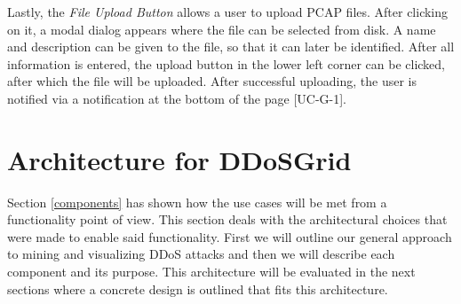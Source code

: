 Lastly, the \emph{File Upload Button} allows a user to upload PCAP files. After clicking on it, a modal dialog appears where the file can be selected from disk. A name and description can be given to the file, so that it can later be identified. After all information is entered, the upload button in the lower left corner can be clicked, after which the file will be uploaded. After successful uploading, the user is notified via a notification at the bottom of the page [UC-G-1].

\section{Architecture for DDoSGrid}
Section \ref{components} has shown how the use cases will be met from a functionality point of view. This section deals with the architectural choices that were made to enable said functionality. First we will outline our general approach to mining and visualizing DDoS attacks and then we will describe each component and its purpose. This architecture will be evaluated in the next sections where a concrete design is outlined that fits this architecture.

